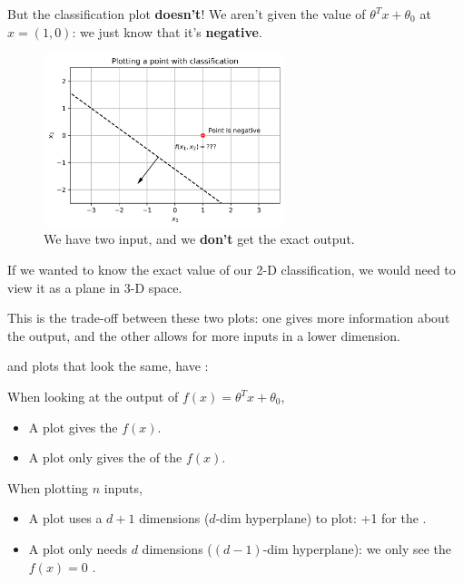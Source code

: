     But the classification plot \textbf{doesn't}! We aren't given the value of $\theta^Tx +\theta_0$ at $x=(1,0)$: we just know that it's \textbf{negative}.
    
    \begin{figure}[H]
        \centering
        
        \includegraphics[width=70mm,scale=0.5]{images/classification_images/2d_classification_plot.png}
        \caption*{We have two input, and we \textbf{don't} get the exact output.}
    \end{figure}
    
    If we wanted to know the exact value of our 2-D classification, we would need to view it as a plane in 3-D space.
    
    This is the trade-off between these two plots: one gives more information about the output, and the other allows for more inputs in a lower dimension.\\
    
    \begin{clarification}
         and  plots that look the same, have : 
        
        When looking at the output of $f(x)=\theta^T x + \theta_0$,
        \begin{itemize}
            \item A  plot gives the  $f(x)$.
            
            \item A  plot only gives the  of the $f(x)$.
        \end{itemize}
        
        When plotting $n$ inputs,
            \begin{itemize}
                \item A  plot uses a $d+1$ dimensions ($d$-dim hyperplane) to plot: +1 for the .
                \item A  plot only needs $d$ dimensions ($(d-1)$-dim hyperplane): we only see the $f(x)=0$ .
            \end{itemize}
    \end{clarification}
    
